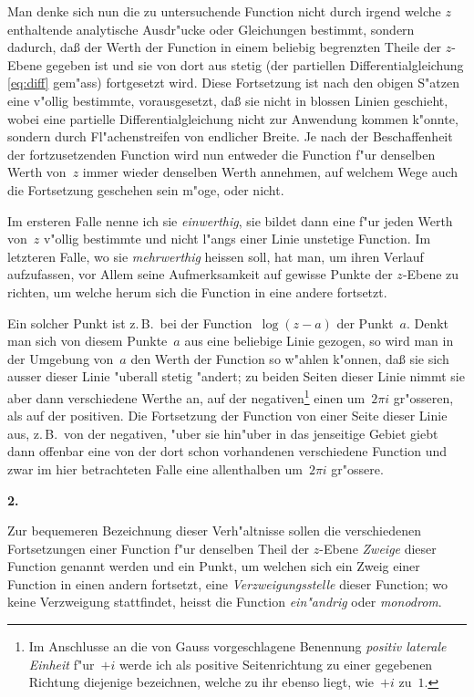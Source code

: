 \documentclass[12pt,a4paper]{article}
\begin{document}
Man denke sich nun die zu untersuchende Function nicht durch irgend
welche $z$ enthaltende analytische Ausdr"ucke oder Gleichungen bestimmt,
sondern dadurch, da\ss{} der Werth der Function in einem beliebig begrenzten
Theile der $z$-Ebene gegeben ist und sie von dort aus stetig (der partiellen
Differentialgleichung \eqref{eq:diff} gem"ass) fortgesetzt wird. Diese
Fortsetzung ist nach den obigen S"atzen eine v"ollig bestimmte,
vorausgesetzt, da\ss{} sie nicht in blossen Linien geschieht, wobei eine
partielle Differentialgleichung nicht zur Anwendung kommen k"onnte,
sondern durch Fl"achenstreifen von endlicher Breite. Je nach der
Beschaffenheit der fortzusetzenden Function wird nun entweder die
Function f"ur denselben Werth von~$z$ immer wieder denselben Werth
annehmen, auf welchem Wege auch die Fortsetzung geschehen sein m"oge,
oder nicht.

Im ersteren Falle nenne ich sie \emph{einwerthig}, sie bildet dann eine
f"ur jeden Werth von~$z$ v"ollig bestimmte und nicht l"angs einer Linie
unstetige Function. Im letzteren Falle, wo sie \emph{mehrwerthig} heissen
soll, hat man, um ihren Verlauf aufzufassen, vor Allem seine Aufmerksamkeit
auf gewisse Punkte der $z$-Ebene zu richten, um welche herum sich die
Function in eine andere fortsetzt.

Ein solcher Punkt ist z.\,B.\ bei der Function~$\log(z-a)$ der Punkt~$a$.
Denkt man sich von diesem Punkte~$a$ aus eine beliebige Linie gezogen,
so wird man in der Umgebung von~$a$ den Werth der Function so w"ahlen
k"onnen, da\ss{} sie sich ausser dieser Linie "uberall stetig "andert; zu beiden
Seiten dieser Linie nimmt sie aber dann verschiedene Werthe an, auf der
negativen\footnote{Im Anschlusse an die von Gauss vorgeschlagene Benennung
\emph{positiv laterale Einheit} f"ur~$+i$ werde ich als positive
Seitenrichtung zu einer gegebenen Richtung diejenige bezeichnen, welche
zu ihr ebenso liegt, wie~$+i$ zu~$1$.} einen um~$2\pi i$ gr"osseren, als auf der
positiven. Die Fortsetzung der Function von einer Seite dieser Linie aus,
z.\,B.\ von der negativen, "uber sie hin"uber in das jenseitige Gebiet
giebt dann offenbar eine von der dort schon vorhandenen verschiedene
Function und zwar im hier betrachteten Falle eine allenthalben um~$2\pi i$
gr"ossere.

\medskip
\textbf{2.}

Zur bequemeren Bezeichnung dieser Verh"altnisse sollen die verschiedenen
Fortsetzungen einer Function f"ur denselben Theil der $z$-Ebene
\emph{Zweige} dieser Function genannt werden und ein Punkt, um welchen
sich ein Zweig einer Function in einen andern fortsetzt, eine
\emph{Verzweigungsstelle} dieser Function; wo keine Verzweigung stattfindet,
heisst die Function \emph{ein"andrig} oder \emph{monodrom}.
\end{document}
